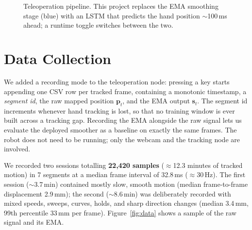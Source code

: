 \documentclass[11pt,a4paper]{article}
\begin{document}
\begin{figure}[t]
  \centering
  \caption{Teleoperation pipeline. This project replaces the EMA smoothing
           stage (blue) with an LSTM that predicts the hand position
           $\sim$100\,ms ahead; a runtime toggle switches between the two.}
  \label{fig:pipeline}
\end{figure}

\section{Data Collection}
\label{sec:data}

We added a recording mode to the teleoperation node: pressing a key starts
appending one CSV row per tracked frame, containing a monotonic timestamp, a
\emph{segment id}, the raw mapped position $\mathbf{p}_t$, and the EMA output
$\mathbf{s}_t$. The segment id increments whenever hand tracking is lost, so
that no training window is ever built across a tracking gap. Recording the EMA
alongside the raw signal lets us evaluate the deployed smoother as a baseline
on exactly the same frames. The robot does not need to be running; only the
webcam and the tracking node are involved.

We recorded two sessions totalling \textbf{22{,}420 samples}
($\approx$12.3 minutes of tracked motion) in 7 segments at a median frame
interval of 32.8\,ms ($\approx$30\,Hz). The first session ($\sim$3.7\,min)
contained mostly slow, smooth motion (median frame-to-frame displacement
2.9\,mm); the second ($\sim$8.6\,min) was deliberately recorded with mixed
speeds, sweeps, curves, holds, and sharp direction changes (median 3.4\,mm,
99th percentile 33\,mm per frame). Figure~\ref{fig:data} shows a sample of the
raw signal and its EMA.
\end{document}
